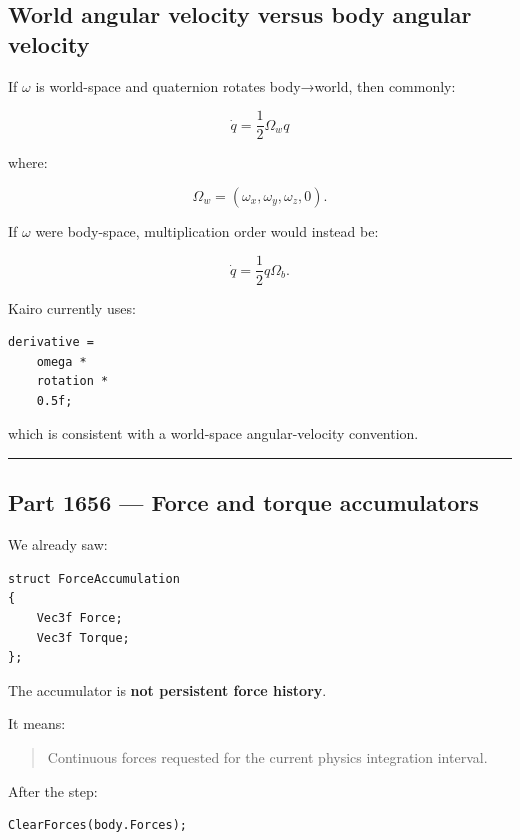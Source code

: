 \subsection{World angular velocity versus body angular velocity}\label{06-engine-ii-ch037-world-angular-velocity-versus-body-angular-velocity}

If \(\omega\) is world-space and quaternion rotates body→world, then commonly:

\[
\boxed{
\dot q
=
\frac12
\Omega_w q
}
\]

where:

\[
\Omega_w=(\omega_x,\omega_y,\omega_z,0).
\]

If \(\omega\) were body-space, multiplication order would instead be:

\[
\dot q
=
\frac12
q\Omega_b.
\]

Kairo currently uses:

\begin{verbatim}
derivative =
    omega *
    rotation *
    0.5f;
\end{verbatim}

which is consistent with a world-space angular-velocity convention.

\begin{center}\rule{0.5\linewidth}{0.5pt}\end{center}

\subsection{Part 1656 --- Force and torque accumulators}\label{06-engine-ii-ch037-part-1656-force-and-torque-accumulators}

We already saw:

\begin{verbatim}
struct ForceAccumulation
{
    Vec3f Force;
    Vec3f Torque;
};
\end{verbatim}

The accumulator is \textbf{not persistent force history}.

It means:

\begin{quote}
Continuous forces requested for the current physics integration interval.
\end{quote}

After the step:

\begin{verbatim}
ClearForces(body.Forces);
\end{verbatim}


